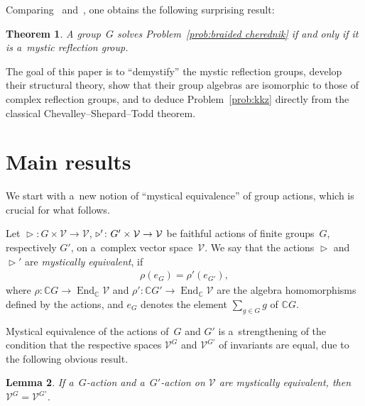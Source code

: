 \documentclass[pdftex]{sigma}
\DeclareMathOperator{\End}{End}
\newtheorem{Theorem}{Theorem}[section]
\newtheorem{Lemma}[Theorem]{Lemma}
\begin{document}
Comparing~\cite[Theorem 1.1 and Corollary 5.6]{KKZ} and~\cite[Theorem 0.7]{BBselecta}, one obtains the following
surprising result:

\begin{Theorem}
A group~$G$ solves Problem~{\rm \ref{prob:braided cherednik}} if and only if it is a~mystic reflection group.
\end{Theorem}

The goal of this paper is to ``demystify'' the mystic ref\/lection groups, develop their structural theory, show that
their group algebras are isomorphic to those of complex ref\/lection groups, and to deduce Problem~\ref{prob:kkz} directly
from the classical Chevalley--Shepard--Todd theorem.

\section{Main results}
\label{sect:main}

We start with a~new notion of ``mystical equivalence'' of group actions, which is crucial for what follows.

\begin{Definition}
Let $ \mathop{\triangleright}\nolimits\colon G \times \mathcal V\to \mathcal V$,
$\mathop{\triangleright}\nolimits\nolimits'\colon G' \times \mathcal V\to \mathcal V $ be faithful actions of f\/inite
groups~$G$, respectively $G'$, on a~complex vector space~$\mathcal V$.
We say that the actions $\mathop{\triangleright}\nolimits$ and $\mathop{\triangleright}\nolimits'$ are
\textit{mystically equivalent}, if
\begin{gather*}
\rho(e_G)=\rho'(e_{G'}),
\end{gather*}
where $\rho\colon \mathbb C G \to \End_\mathbb C \mathcal V$ and $\rho'\colon \mathbb C G'\to \End_\mathbb C\mathcal V$
are the algebra homomorphisms def\/ined by the actions, and $e_G$ denotes the element $\sum\limits_{g\in G}g$ of $\mathbb C G$.
\end{Definition}

Mystical equivalence of the actions of~$G$ and $G'$ is a~strengthening of the condition that the respective spaces
$\mathcal V^G$ and $\mathcal V^{G'}$ of invariants are equal, due to the following obvious result.
\begin{Lemma}%
If a~$G$-action and a~$G'$-action on $\mathcal V$ are mystically equivalent, then $\mathcal V^G=\mathcal V^{G'}$.
\end{Lemma}
\end{document}
